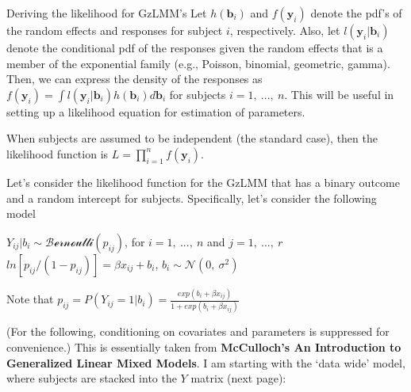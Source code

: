 \documentclass[
  9pt,
  ignorenonframetext,
]{beamer}
\begin{document}
\begin{frame}{Deriving the likelihood for GzLMM's}
\protect\hypertarget{deriving-the-likelihood-for-gzlmms}{}
Let \(h(\pmb b_i)\) and \(f(\pmb y_i)\) denote the pdf's of the random
effects and responses for subject \(i\), respectively. Also, let
\(l(\pmb y_i | \pmb b_i)\) denote the conditional pdf of the responses
given the random effects that is a member of the exponential family
(e.g., Poisson, binomial, geometric, gamma). Then, we can express the
density of the responses as
\(f(\pmb y_i)=\int l(\pmb y_i |\pmb b_i)h(\pmb b_i)d \pmb b_i\) for
subjects \(i=1,\ ...,\ n\). This will be useful in setting up a
likelihood equation for estimation of parameters.

When subjects are assumed to be independent (the standard case), then
the likelihood function is \(L=\prod _{i=1}^n f(\pmb y_i)\).
\end{frame}

\begin{frame}{}
\protect\hypertarget{section-7}{}
Let's consider the likelihood function for the GzLMM that has a binary
outcome and a random intercept for subjects. Specifically, let's
consider the following model

\(Y_{ij} |b_i \sim \mathcal {Bernoulli}(p_{ij})\), for \(i=1,\ ...,\ n\)
and \(j=1,\ ...,\ r\) \(ln[p_{ij}/(1-p_{ij})]=\beta x_{ij}+b_i\),
\(b_i \sim \mathcal N (0,\ \sigma ^2)\)

Note that
\(p_{ij}=P(Y_{ij}=1|b_i)=\frac {exp( b_i+\beta x_{ij})} { 1+exp( b_i+\beta x_{ij})}\)

(For the following, conditioning on covariates and parameters is
suppressed for convenience.) This is essentially taken from
\textbf{McCulloch's An Introduction to Generalized Linear Mixed Models}.
I am starting with the `data wide' model, where subjects are stacked
into the \(Y\) matrix (next page):
\end{frame}
\end{document}
